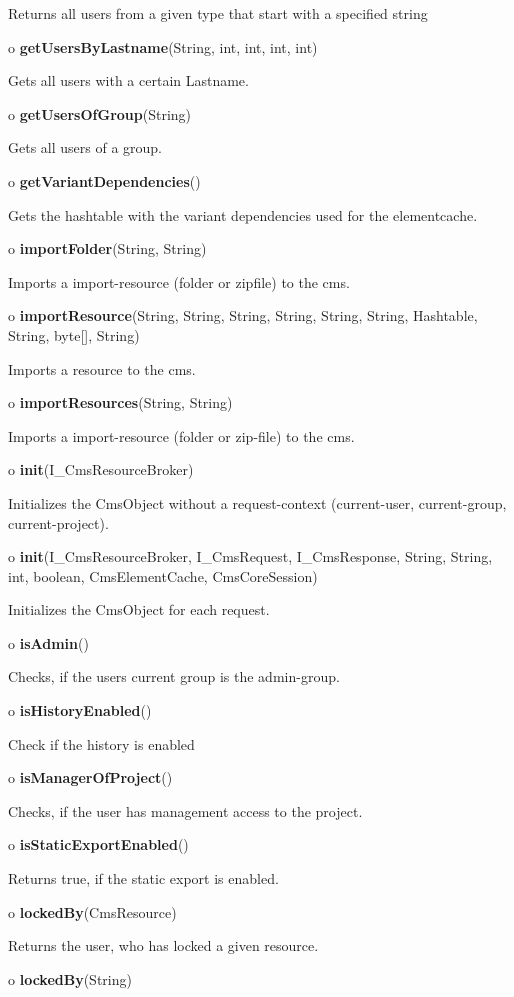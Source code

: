 \begin{description}
Returns all users from a given type that start with a specified string  
\item o {\bf getUsersByLastname}(String, int, int, int, int)  

Gets all users with a certain Lastname.  
\item o {\bf getUsersOfGroup}(String)  

Gets all users of a group.  
\item o {\bf getVariantDependencies}()  

Gets the hashtable with the variant dependencies used for the elementcache.  
\item o {\bf importFolder}(String, String)  

Imports a import-resource (folder or zipfile) to the cms.  
\item o {\bf importResource}(String, String, String, String, String, String,
Hashtable, String, byte[], String)  

Imports a resource to the cms.  
\item o {\bf importResources}(String, String)  

Imports a import-resource (folder or zip-file) to the cms.  
\item o {\bf init}(I\_CmsResourceBroker)  

Initializes the CmsObject without a request-context (current-user,
current-group, current-project).  
\item o {\bf init}(I\_CmsResourceBroker, I\_CmsRequest, I\_CmsResponse,
String, String, int, boolean, CmsElementCache, CmsCoreSession)  

Initializes the CmsObject for each request.  
\item o {\bf isAdmin}()  

Checks, if the users current group is the admin-group.  
\item o {\bf isHistoryEnabled}()  

Check if the history is enabled  
\item o {\bf isManagerOfProject}()  

Checks, if the user has management access to the project.  
\item o {\bf isStaticExportEnabled}()  

Returns true, if the static export is enabled.  
\item o {\bf lockedBy}(CmsResource)  

Returns the user, who has locked a given resource.  
\item o {\bf lockedBy}(String)  


\end{description}

